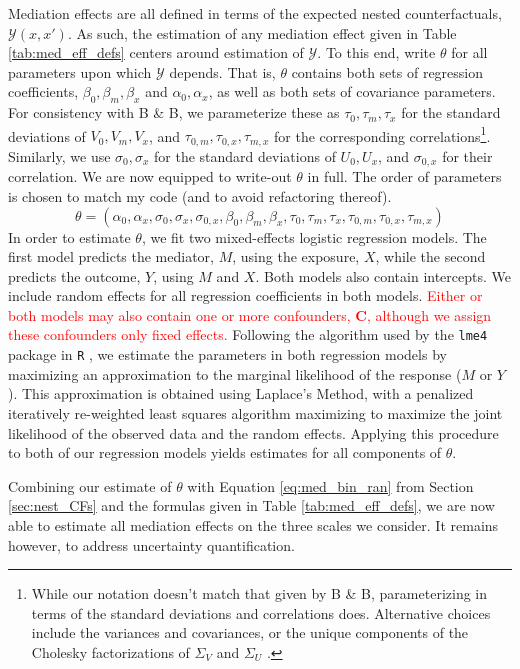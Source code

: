 \documentclass{report}
\newcommand{\sY}{\mathcal{Y}}
\begin{document}
Mediation effects are all defined in terms of the expected nested counterfactuals, $\sY(x, x')$. As such, the estimation of any mediation effect given in Table \ref{tab:med_eff_defs} centers around estimation of $\sY$. To this end, write $\theta$ for all parameters upon which $\sY$ depends. That is, $\theta$ contains both sets of regression coefficients, $\beta_0, \beta_m, \beta_x$ and $\alpha_0, \alpha_x$, as well as both sets of covariance parameters. For consistency with B \& B, we parameterize these as $\tau_0, \tau_m, \tau_x$ for the standard deviations of $V_0, V_m, V_x$, and $\tau_{0,m}, \tau_{0,x}, \tau_{m,x}$ for the corresponding correlations\footnote{While our notation doesn't match that given by B \& B, parameterizing in terms of the standard deviations and correlations does. Alternative choices include the variances and covariances, or the unique components of the Cholesky factorizations of $\Sigma_V$ and $\Sigma_U$ \citep{Wan18}.}. Similarly, we use $\sigma_0, \sigma_x$ for the standard deviations of $U_0, U_x$, and $\sigma_{0,x}$ for their correlation. We are now equipped to write-out $\theta$ in full. The order of parameters is chosen to match my code (and to avoid refactoring thereof).
$$
\theta = (\alpha_0, \alpha_x, \sigma_0, \sigma_x, \sigma_{0,x}, \beta_0, \beta_m, \beta_x, \tau_0, \tau_m, \tau_x, \tau_{0,m}, \tau_{0,x}, \tau_{m,x})
$$
%
In order to estimate $\theta$, we fit two mixed-effects logistic regression models. The first model predicts the mediator, $M$, using the exposure, $X$, while the second predicts the outcome, $Y$, using $M$ and $X$. Both models also contain intercepts. We include random effects for all regression coefficients in both models. \textcolor{red}{Either or both models may also contain one or more confounders, $\mathbf{C}$, although we assign these confounders only fixed effects.} Following the algorithm used by the \texttt{lme4} package in \texttt{R} \citep{Bat15, Wal23}, we estimate the parameters in both regression models by maximizing an approximation to the marginal likelihood of the response ($M$ or $Y$). This approximation is obtained using Laplace's Method, with a penalized iteratively re-weighted least squares algorithm maximizing to maximize the joint likelihood of the observed data and the random effects. Applying this procedure to both of our regression models yields estimates for all components of $\theta$.

Combining our estimate of $\theta$ with Equation \ref{eq:med_bin_ran} from Section \ref{sec:nest_CFs} and the formulas given in Table \ref{tab:med_eff_defs}, we are now able to estimate all mediation effects on the three scales we consider. It remains however, to address uncertainty quantification.
\end{document}
